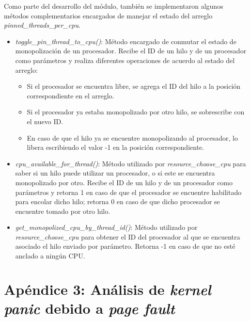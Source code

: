 Como parte del desarrollo del módulo, también se implementaron algunos métodos complementarios encargados de manejar el estado del arreglo \textit{pinned\_threads\_per\_cpu}.

\begin{itemize}
    \item \textit{toggle\_pin\_thread\_to\_cpu()}: Método encargado de conmutar el estado de monopolización de un procesador. Recibe el ID de un hilo y de un procesador como parámetros y realiza diferentes operaciones de acuerdo al estado del arreglo:
    \begin{itemize}
        \item Si el procesador se encuentra libre, se agrega el ID del hilo a la posición correspondiente en el arreglo.
        \item Si el procesador ya estaba monopolizado por otro hilo, se sobrescribe con el nuevo ID.
        \item En caso de que el hilo ya se encuentre monopolizando al procesador, lo libera escribiendo el valor -1 en la posición correspondiente.
    \end{itemize}
    \item \textit{cpu\_available\_for\_thread()}: Método utilizado por \textit{resource\_choose\_cpu} para saber si un hilo puede utilizar un procesador, o si este se encuentra monopolizado por otro. Recibe el ID de un hilo y de un procesador como parámetros y retorna 1 en caso de que el procesador se encuentre habilitado para encolar dicho hilo; retorna 0 en caso de que dicho procesador se encuentre tomado por otro hilo.
    \item \textit{get\_monopolized\_cpu\_by\_thread\_id()}: Método utilizado por \textit{resource\_choose\_cpu} para obtener el ID del procesador al que se encuentra asociado el hilo enviado por parámetro. Retorna -1 en caso de que no esté anclado a ningún CPU.
\end{itemize}

\section{Apéndice 3: Análisis de \textit{kernel panic} debido a \textit{page fault}}\label{appendix:apC}

